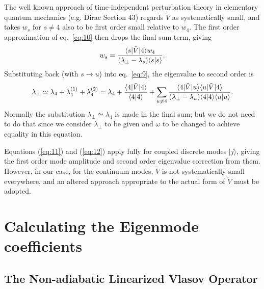 \documentclass[12pt]{article}
\def\ket#1{|#1\rangle}
\def\bra#1{\langle#1}
\begin{document}
The well known approach of time-independent perturbation theory in
elementary quantum mechanics (e.g. Dirac Section 43) regards $\tilde{V}$ as
systematically small, and takes $w_s$ for $s\not=4$ also to be first
order small relative to $w_4$. The first order approximation of eq.\
\ref{eq:10} then drops the final sum term, giving
\begin{equation}
  \label{eq:11}
  w_s = {\bra{s}|\tilde{V}\ket{4}w_4\over (\lambda_\perp-\lambda_s)\bra{s}\ket{s}}.
\end{equation}
Substituting back (with $s\to u$) into eq.\ \ref{eq:9}, the
eigenvalue to second order is
\begin{equation}
  \label{eq:12}
 \lambda_\perp\simeq \lambda_4+\lambda_{4}^{(1)}+\lambda_{4}^{(2)}=\lambda_4
  +{\bra{4}|\tilde{V}\ket{4}\over \bra{4}\ket{4}}
    +\sum_{u\not=4}
    {\bra{4}|\tilde{V}\ket{u}\bra{u}|\tilde{V}\ket{4}\over
      (\lambda_\perp-\lambda_u)\bra{4}\ket{4}\bra{u}\ket{u}}.
\end{equation}
Normally the substitution $\lambda_\perp\simeq\lambda_4$ is made in
the final sum; but we do not need to do that since we consider
$\lambda_\perp$ to be given and $\omega$ to be changed to achieve
equality in this equation.

Equations (\ref{eq:11}) and (\ref{eq:12}) apply fully for coupled
discrete modes $\ket{j}$, giving the first order mode amplitude and
second order eigenvalue correction from them.  However, in our case,
for the continuum modes, $\tilde{V}$ is not systematically small
everywhere, and an altered approach appropriate to the actual form of
$\tilde{V}$ must be adopted.


\section{Calculating the Eigenmode coefficients}
\subsection{The Non-adiabatic Linearized Vlasov Operator}
\end{document}
